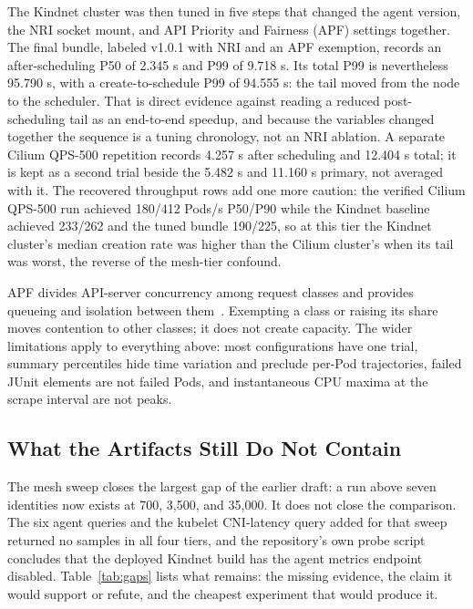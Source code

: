 The Kindnet cluster was then tuned in five steps that changed the agent
version, the NRI socket mount, and API Priority and Fairness (APF)
settings together. The final bundle, labeled v1.0.1 with NRI and an APF
exemption, records an after-scheduling P50 of 2.345 s and P99 of 9.718 s.
Its total P99 is nevertheless 95.790 s, with a create-to-schedule P99 of
94.555 s: the tail moved from the node to the scheduler. That is direct
evidence against reading a reduced post-scheduling tail as an end-to-end
speedup, and because the variables changed together the sequence is a
tuning chronology, not an NRI ablation. A separate Cilium QPS-500
repetition records 4.257 s after scheduling and 12.404 s total; it is
kept as a second trial beside the 5.482 s and 11.160 s primary, not
averaged with it. The recovered throughput rows add one more caution: the
verified Cilium QPS-500 run achieved 180/412 Pods/s P50/P90 while the
Kindnet baseline achieved 233/262 and the tuned bundle 190/225, so at
this tier the Kindnet cluster's median creation rate was higher than the
Cilium cluster's when its tail was worst, the reverse of the mesh-tier
confound.

APF divides API-server concurrency among request classes and provides
queueing and isolation between them~\cite{k8sapf}. Exempting a class or
raising its share moves contention to other classes; it does not create
capacity. The wider limitations apply to everything above: most
configurations have one trial, summary percentiles hide time variation
and preclude per-Pod trajectories, failed JUnit elements are not failed
Pods, and instantaneous CPU maxima at the scrape interval are not peaks.

\subsection{What the Artifacts Still Do Not Contain}
\label{sec:gaps}
The \sys{} mesh sweep closes the largest gap of the earlier draft: a
\sys{} run above seven identities now exists at 700, 3,500, and 35,000.
It does not close the comparison. The six \sys{} agent queries and the
kubelet CNI-latency query added for that sweep returned no samples in
all four tiers, and the repository's own probe script concludes that the
deployed Kindnet build has the agent metrics endpoint disabled.
Table~\ref{tab:gaps} lists what remains: the missing evidence, the claim
it would support or refute, and the cheapest experiment that would
produce it.

